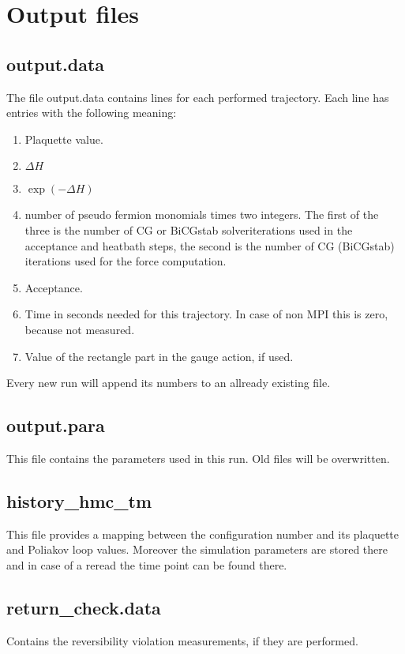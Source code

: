 \section{Output files}

\subsection*{\ttfamily output.data}

The file {\ttfamily output.data} contains lines for each performed
trajectory. Each line has entries with the following meaning:
\begin{enumerate}
\item Plaquette value.
\item $\Delta H$
\item $\exp(-\Delta H)$
\item number of pseudo fermion monomials times two integers. The first
  of the three is the number of CG or BiCGstab solveriterations used
  in the acceptance and heatbath steps, the second is the number of CG
  (BiCGstab) iterations used for the force computation.
\item Acceptance.
\item Time in seconds needed for this trajectory. In case of non MPI
  this is zero, because not measured.
\item Value of the rectangle part in the gauge action, if used.
\end{enumerate}
Every new run will append its numbers to an allready existing file.

\subsection*{\ttfamily output.para}
This file contains the parameters used in this run. Old files will be
overwritten. 

\subsection*{\ttfamily history\_hmc\_tm}
This file provides a mapping between the configuration number and its
plaquette and Poliakov loop values. Moreover the simulation parameters
are stored there and in case of a reread the time point can be found there. 

\subsection*{\ttfamily return\_check.data}
Contains the reversibility violation measurements, if they are
performed. 

